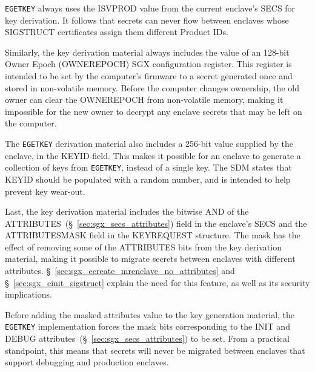 \texttt{EGETKEY} always uses the ISVPROD value from the current enclave's SECS
for key derivation. It follows that secrets can never flow between enclaves
whose SIGSTRUCT certificates assign them different Product IDs.

Similarly, the key derivation material always includes the value of an 128-bit
Owner Epoch (OWNEREPOCH) SGX configuration register. This register is intended
to be set by the computer's firmware to a secret generated once and stored in
non-volatile memory. Before the computer changes ownership, the old owner can
clear the OWNEREPOCH from non-volatile memory, making it impossible for the new
owner to decrypt any enclave secrets that may be left on the computer.

The \texttt{EGETKEY} derivation material also includes a 256-bit value supplied
by the enclave, in the KEYID field. This makes it possible for an enclave to
generate a collection of keys from \texttt{EGETKEY}, instead of a single key.
The SDM states that KEYID should be populated with a random number, and is
intended to help prevent key wear-out.

Last, the key derivation material includes the bitwise AND of the
ATTRIBUTES~(\S~\ref{sec:sgx_secs_attributes}) field in the enclave's SECS and
the ATTRIBUTESMASK field in the KEYREQUEST structure. The mask has the effect
of removing some of the ATTRIBUTES bits from the key derivation material,
making it possible to migrate secrets between enclaves with different
attributes. \S~\ref{sec:sgx_ecreate_mrenclave_no_attributes} and
\S~\ref{sec:sgx_einit_sigstruct} explain the need for this feature, as well as
its security implications.

Before adding the masked attributes value to the key generation material, the
\texttt{EGETKEY} implementation forces the mask bits corresponding to the
INIT and DEBUG attributes~(\S~\ref{sec:sgx_secs_attributes}) to be set. From a
practical standpoint, this means that secrets will never be migrated between
enclaves that support debugging and production enclaves.

